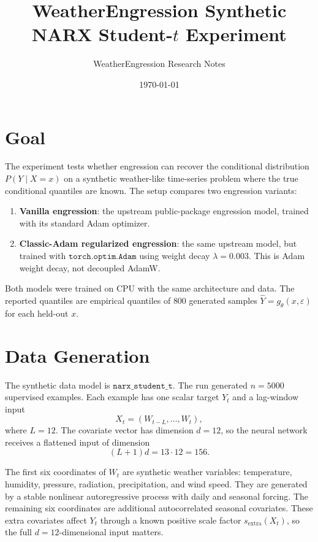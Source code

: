 \documentclass[11pt]{article}
\title{WeatherEngression Synthetic NARX Student-\(t\) Experiment}
\author{WeatherEngression Research Notes}
\date{\today}
\begin{document}
\maketitle

\section{Goal}

The experiment tests whether engression can recover the conditional
distribution \(P(Y \mid X=x)\) on a synthetic weather-like time-series problem
where the true conditional quantiles are known.  The setup compares two
engression variants:

\begin{enumerate}
  \item \textbf{Vanilla engression}: the upstream public-package engression
  model, trained with its standard Adam optimizer.
  \item \textbf{Classic-Adam regularized engression}: the same upstream model,
  but trained with \(\texttt{torch.optim.Adam}\) using weight decay
  \(\lambda=0.003\).  This is Adam weight decay, not decoupled AdamW.
\end{enumerate}

Both models were trained on CPU with the same architecture and data.  The
reported quantiles are empirical quantiles of \(800\) generated samples
\(\widehat{Y}=g_\theta(x,\varepsilon)\) for each held-out \(x\).

\section{Data Generation}

The synthetic data model is \(\texttt{narx\_student\_t}\).  The run generated
\(n=5000\) supervised examples.  Each example has one scalar target \(Y_t\) and
a lag-window input
\[
  X_t = (W_{t-L},\ldots,W_t),
\]
where \(L=12\).  The covariate vector has dimension \(d=12\), so the neural
network receives a flattened input of dimension
\[
  (L+1)d = 13\cdot 12 = 156.
\]

The first six coordinates of \(W_t\) are synthetic weather variables:
temperature, humidity, pressure, radiation, precipitation, and wind speed.
They are generated by a stable nonlinear autoregressive process with daily and
seasonal forcing.  The remaining six coordinates are additional autocorrelated
seasonal covariates.  These extra covariates affect \(Y_t\) through a known
positive scale factor \(s_{\mathrm{extra}}(X_t)\), so the full
\(d=12\)-dimensional input matters.
\end{document}
